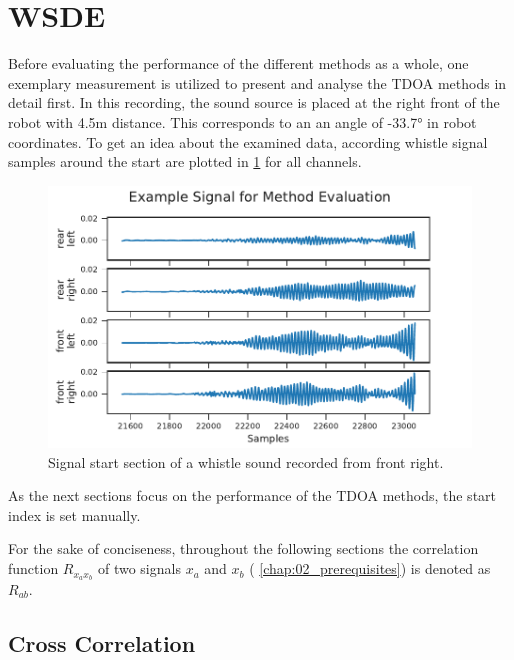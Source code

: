\section{\acl{WSDE}}
\label{sec:04_tdoaSingle}

Before evaluating the performance of the different methods as a whole,
one exemplary measurement is utilized
to present and analyse the \ac{TDOA} methods in detail first.
In this recording, the sound source is placed at the right front
of the robot with 4.5\si{m} distance.
This corresponds to an an angle of -33.7\si{\degree} in robot coordinates.
To get an idea about the examined data, according whistle signal samples around the
start are plotted in \cref{fig:04_tdoaSignal} for all channels.
\begin{figure}[ht]
	\centering
		\includegraphics[]{figures/evaluation/cc_frontRight_1_signal}
	\caption{Signal start section of a whistle sound recorded from front right.}
	\label{fig:04_tdoaSignal}
\end{figure}

As the next sections focus on the performance of the \ac{TDOA} methods,
the start index is set manually.

For the sake of conciseness, throughout the following sections the correlation
function $R_{x_ax_b}$ of two signals $x_a$ and $x_b$  (\cf
\cref{chap:02_prerequisites}) is denoted as $R_{ab}$.


\subsection{Cross Correlation}
\label{subsec:04_ccSingle}

